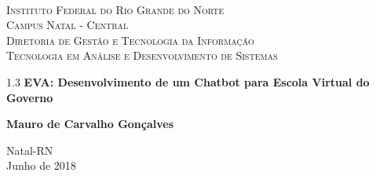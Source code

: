 \begin{titlepage}
	\begin{center}
		
		  
		\begin{minipage}{11.15cm}
			\begin{center}
				\begin{espacosimples}
					{\small \ \\
                       \textsc{Instituto Federal do Rio Grande do Norte}
                       \\
							  \textsc{Campus Natal - Central}					\\
							  \textsc{Diretoria de Gestão e Tecnologia da Informação}	   
							  \\
							  \textsc{Tecnologia em Análise e Desenvolvimento de Sistemas}}   	
                       \\
				\end{espacosimples}
			\end{center}
		\end{minipage}

			
		\vspace{6cm}
						
		{\setlength{\baselineskip}%
		{1.3\baselineskip}
		{\LARGE \textbf{EVA: Desenvolvimento de um Chatbot para Escola Virtual do Governo}}\par}
			
		\vspace{3cm}
			
		{\large \textbf{Mauro de Carvalho Gonçalves}}
						
		\vspace{6cm}
		
		Natal-RN\\Junho de 2018
	\end{center}
\end{titlepage}